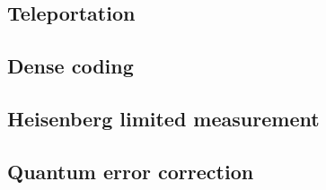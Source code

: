 \documentclass[aps,pra,groupedaddress]{revtex4-1}
\begin{document}
\subsection{Teleportation}

\subsection{Dense coding}

\subsection{Heisenberg limited measurement}

\subsection{Quantum error correction}




%


\end{document}
